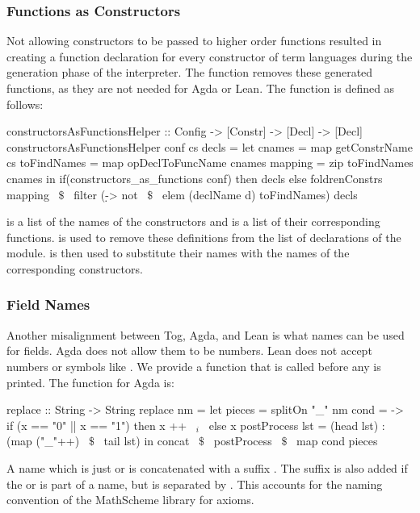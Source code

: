 \subsubsection{Functions as Constructors}
Not allowing constructors to be passed to higher order functions resulted in creating a function declaration for every constructor of term languages during the generation phase of the interpreter. 
The function  removes these generated functions, as they are not needed for Agda or Lean. The function is defined as follows: 
\begin{hscode} 
constructorsAsFunctionsHelper :: Config -> [Constr] -> [Decl] -> [Decl] 
constructorsAsFunctionsHelper conf cs decls =
  let cnames = map getConstrName cs
      toFindNames = map opDeclToFuncName cnames 
      mapping = zip toFindNames cnames
  in if(constructors_as_functions conf) then decls 
      else foldrenConstrs mapping ~$\$$~ 
               filter (\d -> not  ~$\$$~  elem (declName d) toFindNames) decls     
\end{hscode} 
\noindent {} is a list of the names of the constructors and  is a list of their corresponding functions.  is used to remove these definitions from the list of declarations of the module.  is then used to substitute their names with the names of the corresponding constructors. 

\subsubsection{Field Names}
Another misalignment between Tog, Agda, and Lean is what names can be used for fields. Agda does not allow them to be numbers. Lean does not accept numbers or symbols like \lstmath{+, *, \|>, <\|}. 
We provide a function  that is called before any  is printed. The  function for Agda is: 
\begin{hscode}
replace :: String -> String
replace nm =
  let pieces = splitOn "_" nm
      cond = \x -> if (x == "0" || x == "1") then x ++ ~$_i$~ else x
      postProcess lst = (head lst) : (map ("_"++) ~$\$$~ tail lst)
  in concat ~$\$$~ postProcess ~$\$$~ map cond pieces 
\end{hscode}
A name which is just  or  is concatenated with a suffix . The suffix is also added if the  or  is part of a name, but is separated by \lstmath{_}. This accounts for the naming convention of the MathScheme library for axioms. 

